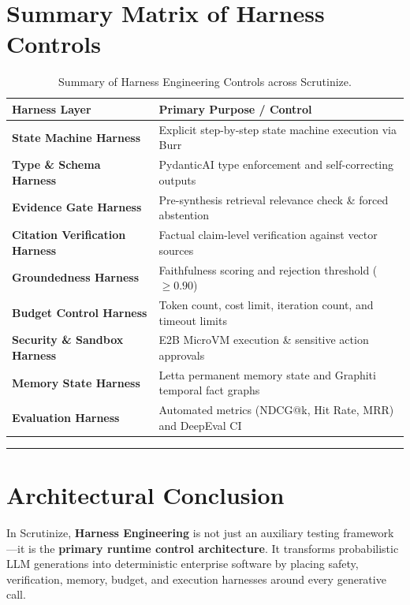\documentclass{article}
\begin{document}
\section{Summary Matrix of Harness Controls}

\begin{table}[h!]
\centering
\small
\begin{tabular}{ll}
\toprule
\textbf{Harness Layer} & \textbf{Primary Purpose / Control} \\
\midrule
\textbf{State Machine Harness} & Explicit step-by-step state machine execution via Burr \\
\textbf{Type \& Schema Harness} & PydanticAI type enforcement and self-correcting outputs \\
\textbf{Evidence Gate Harness} & Pre-synthesis retrieval relevance check \& forced abstention \\
\textbf{Citation Verification Harness} & Factual claim-level verification against vector sources \\
\textbf{Groundedness Harness} & Faithfulness scoring and rejection threshold ($\ge 0.90$) \\
\textbf{Budget Control Harness} & Token count, cost limit, iteration count, and timeout limits \\
\textbf{Security \& Sandbox Harness} & E2B MicroVM execution \& sensitive action approvals \\
\textbf{Memory State Harness} & Letta permanent memory state and Graphiti temporal fact graphs \\
\textbf{Evaluation Harness} & Automated metrics (NDCG@k, Hit Rate, MRR) and DeepEval CI \\
\bottomrule
\end{tabular}
\caption{Summary of Harness Engineering Controls across Scrutinize.}
\end{table}

\hrule
\vspace{0.5cm}

\section{Architectural Conclusion}

In Scrutinize, \textbf{Harness Engineering} is not just an auxiliary testing framework---it is the \textbf{primary runtime control architecture}. It transforms probabilistic LLM generations into deterministic enterprise software by placing safety, verification, memory, budget, and execution harnesses around every generative call.
\end{document}
